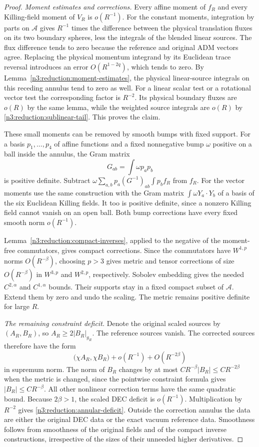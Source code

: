 \begin{proof}
\emph{Moment estimates and corrections.} Every affine moment of $f_R$
and every Killing-field moment of $V_R$ is $o(R^{-1})$.  For the constant moments, integration by parts on
$\mathcal A$ gives $R^{-1}$ times the difference between the physical
translation fluxes on its two boundary spheres, less the integrals of
the blended linear sources.  The flux difference tends to zero because
the reference and original ADM vectors agree.  Replacing the physical
momentum integrand by its Euclidean trace reversal introduces an error
$O(R^{1-2q})$, which tends to zero.  By
Lemma~\ref{n3:reduction:moment-estimates}, the physical linear-source
integrals on this receding annulus tend to zero as well.
For a linear scalar test or a rotational vector test the corresponding
factor is $R^{-2}$.  Its physical boundary fluxes are $o(R)$ by the same
lemma, while the weighted source integrals are $o(R)$ by
\eqref{n3:reduction:sublinear-tail}.  This proves the claim.

These small moments can be removed by smooth bumps with fixed support.
For a basis $p_1,\ldots,p_4$ of affine functions and a fixed nonnegative bump
$\omega$ positive on a ball inside the annulus, the Gram matrix
\[
 G_{ab}=\int\omega p_ap_b
\]
is positive definite.  Subtract
$\omega\sum_{a,b}p_a(G^{-1})_{ab}\int p_bf_R$ from $f_R$.
For the vector moments use the same construction with the Gram matrix
$\int\omega Y_a\cdot Y_b$ of a basis of the six Euclidean Killing fields.
It too is positive definite, since a nonzero Killing field cannot vanish
on an open ball.  Both bump corrections have every fixed smooth norm
$o(R^{-1})$.

Lemma~\ref{n3:reduction:compact-inverses}, applied to the negative of
the moment-free commutators, gives compact corrections. Since the
commutators have $W^{1,p}$ norms $O(R^{-\beta})$, choosing $p>3$ gives
metric and tensor corrections of size $O(R^{-\beta})$
in $W^{3,p}$ and $W^{2,p}$, respectively.  Sobolev embedding gives the
needed $C^{2,\alpha}$ and $C^{1,\alpha}$ bounds.  Their supports stay in
a fixed compact subset of $\mathcal A$.  Extend them by zero and undo
the scaling.  The metric remains positive definite for large $R$.

\emph{The remaining constraint deficit.} Denote the original scaled
sources by $(A_R,B_R)$, so
$A_R\ge2|B_R|_{g_R}$.  The reference sources vanish.  The corrected
sources therefore have the form
\[
 \bigl(\chi A_R,\chi B_R\bigr)
       +o(R^{-1})+O(R^{-2\beta})
\]
in supremum norm.  The norm of $B_R$ changes by at most
$CR^{-\beta}|B_R|\le CR^{-2\beta}$ when the metric is changed, since
the pointwise constraint formula gives $|B_R|\le CR^{-\beta}$.
All other nonlinear correction terms have the same quadratic bound.
Because $2\beta>1$, the scaled DEC deficit is $o(R^{-1})$.
Multiplication by $R^{-2}$ gives
\eqref{n3:reduction:annular-deficit}.  Outside the correction annulus
the data are either the original DEC data or the exact vacuum reference
data.  Smoothness follows from smoothness of the original fields and of
the compact inverse constructions, irrespective of the sizes of their
unneeded higher derivatives.
\end{proof}

